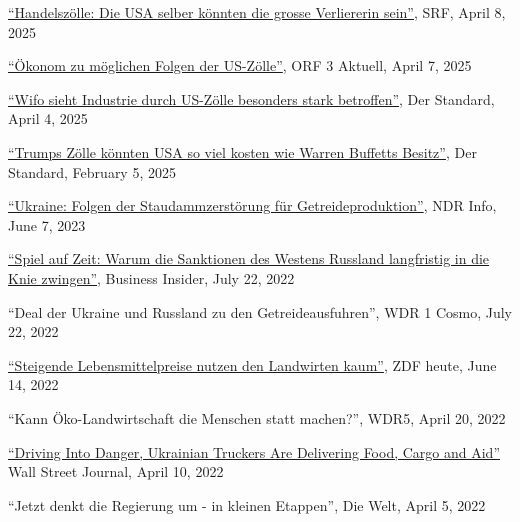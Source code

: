 \documentclass{article}
\newlength{\cvlabelwidth}\setlength{\cvlabelwidth}{0.12\textwidth}
\newlength{\cvlabelgap}\setlength{\cvlabelgap}{5mm}
\newcommand{\cvmakelabel}[1]{%
    \smash{\parbox[t]{\cvlabelwidth}{\raggedright{\fontfamily{phv}\selectfont #1}}}}
\newenvironment{cvsection}[1]{%
    \par\medskip
    \begin{list}{}{%
        \setlength{\leftmargin}{\dimexpr\cvlabelwidth+\cvlabelgap\relax}%
        \setlength{\labelwidth}{\cvlabelwidth}%
        \setlength{\labelsep}{\cvlabelgap}%
        \setlength{\rightmargin}{0pt}%
        \setlength{\itemindent}{0pt}%
        \setlength{\listparindent}{0pt}%
        \setlength{\topsep}{0pt}%
        \setlength{\partopsep}{0pt}%
        \setlength{\parsep}{0.3em}%
        \setlength{\itemsep}{0pt}%
        \let\makelabel\cvmakelabel%
    }%
    \item[#1]\ignorespaces%
}{%
    \end{list}\medskip%
}
\begin{document}
\begin{cvsection}{SELECTED MEDIA APPEARANCE}
  \href{https://www.srf.ch/audio/echo-der-zeit/handelszoelle-die-usa-selber-koennten-die-grosse-verliererin-sein?partId=77nj5adJX0fKQd92D0cUOK53Vmw}{``Handelszölle: Die USA selber könnten die grosse Verliererin sein''}, SRF, April 8, 2025 \par
  \href{https://on.orf.at/video/14270682/15857146/oekonom-zu-moeglichen-folgen-der-us-zoelle}{``Ökonom zu möglichen Folgen der US-Zölle''}, ORF 3 Aktuell, April 7, 2025 \par
    \href{https://www.derstandard.at/story/3000000264273/trump-stellt-china-zollnachlass-f252r-entgegenkommen-bei-tiktok-verkauf-in-aussicht}{``Wifo sieht Industrie durch US-Zölle besonders stark betroffen''}, Der Standard, April 4, 2025 \par 
    \href{https://www.derstandard.de/story/3000000256055/trumps-zoelle-koennten-usa-so-viel-kosten-wie-warren-buffett-besitzt}{``Trumps Zölle könnten USA so viel kosten wie Warren Buffetts Besitz''}, Der Standard, February 5, 2025 \par
    \href{https://www.ndr.de/nachrichten/info/Wirtschaft-Folgen-der-Staudammzerstoerung-fuer-Getreideproduktion,audio1398696.html}{``Ukraine: Folgen der Staudammzerstörung für Getreideproduktion''}, NDR Info, June 7, 2023 \par

      \href{https://www.businessinsider.de/politik/welt/spiel-auf-zeit-warum-die-bundesregierung-und-experten-glauben-dass-die-sanktionen-des-westens-russland-langfristig-in-die-knie-zwingen-werden/}{``Spiel auf Zeit: Warum die Sanktionen des Westens Russland langfristig in die Knie zwingen''}, Business Insider, July 22, 2022 \par
    ``Deal der Ukraine und Russland zu den Getreideausfuhren'', WDR 1 Cosmo, July 22, 2022 \par
    \href{https://www.zdf.de/nachrichten/heute-19-uhr/bauerntag-luebeck-oezdemir-video-100.html}{``Steigende Lebensmittelpreise nutzen den Landwirten kaum''}, ZDF heute, June 14, 2022 \par
    ``Kann Öko-Landwirtschaft die Menschen statt machen?'', WDR5, April 20, 2022 \par
    \href{https://www.wsj.com/articles/driving-into-danger-ukrainian-truckers-are-delivering-food-cargo-and-aid-11649595601}{``Driving Into Danger, Ukrainian Truckers Are Delivering Food, Cargo and Aid''} Wall Street Journal, April 10, 2022 \par
    ``Jetzt denkt die Regierung um - in kleinen Etappen'', Die Welt, April 5, 2022 \par


\end{cvsection}
\end{document}
